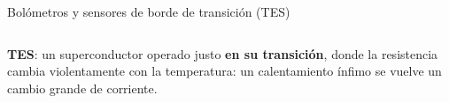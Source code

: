 \begin{frame}{Bolómetros y sensores de borde de transición (TES)}
\begin{columns}[c,onlytextwidth]
      \begin{clave}
        \textbf{TES}: un superconductor operado justo \textbf{en su
        transición}, donde la resistencia cambia violentamente con la
        temperatura: un calentamiento ínfimo se vuelve un cambio grande de
        corriente.
      \end{clave}
  \end{columns}
\end{frame}

